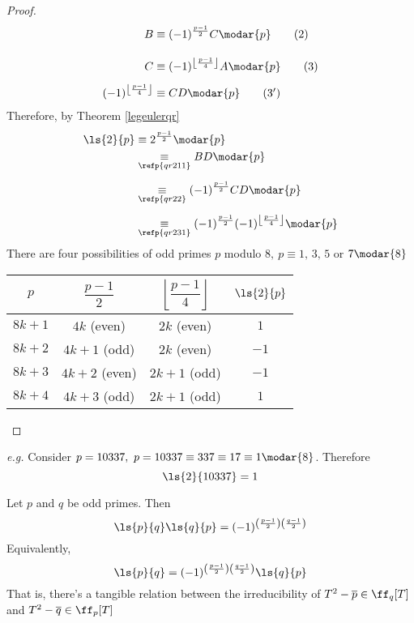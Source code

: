 \begin{proof}
\begin{align*}
B&\equiv (-1)^{\frac{p-1}{2}} C\modar{p} \label{qr22}\tag{$2$}\\[1em]
C &\equiv (-1)^{\left\lfloor \frac{p-1}{4}\right\rfloor} A\modar{p} \label{qr23}\tag{$3$}\\[0.5em]
(-1)^{\left\lfloor \frac{p-1}{4}\right\rfloor} &\equiv CD \modar{p} \label{qr231}\tag{$3'$}
\end{align*}
Therefore, by Theorem \ref{legeulerqr}
\begin{align*}
\ls{2}{p} &\equiv 2^{\frac{p-1}{2}}\modar{p}\\
&\underset{\refp{qr211}}{\equiv} BD\modar{p}\\[0.5em]
&\underset{\refp{qr22}}{\equiv} (-1)^{\frac{p-1}{2}} CD\modar{p}\\[0.5em]
&\underset{\refp{qr231}}{\equiv} (-1)^{\frac{p-1}{2}}(-1)^{\left\lfloor \frac{p-1}{4}\right\rfloor}\modar{p}
\end{align*}
There are four possibilities of odd primes $p$ modulo $8,\ p\equiv 1,\,3,\,5$ or $7\modar{8}$\\
\begin{center}
{\renewcommand{\arraystretch}{2}%
\begin{tabular}{|c|c|c|c|}
\hline
$p$ & $\dfrac{p-1}{2}$ & $\left\lfloor \dfrac{p-1}{4}\right\rfloor$ & $\ls{2}{p}$\\[0.5em]
\hline
$8k + 1$ & $4k$ (even) & $2k$ (even) & $1$ \\
\hline
$8k + 2$ & $4k + 1$ (odd) & $2k$ (even) & $-1$ \\
\hline
$8k + 3$ & $4k + 2$ (even) & $2k + 1$ (odd) & $-1$ \\
\hline
$8k + 4$ & $4k + 3$ (odd) & $2k + 1$ (odd) & $1$ \\
\hline
\end{tabular}}
\end{center}
\end{proof}

\vspace*{0.5em}

\emph{e.g.} Consider $p = 10337,\ p = 10337 \equiv 337 \equiv 17 \equiv 1 \modar{8}$. Therefore
\[\ls{2}{10337} = 1\]

\vspace*{1em}

\begin{theorem}
Let $p$ and $q$ be odd primes. Then
\[\ls{p}{q}\ls{q}{p} = (-1)^{\left(\frac{p-1}{2}\right)\left(\frac{q-1}{2}\right)}\]
Equivalently,
\[\ls{p}{q} = (-1)^{\left(\frac{p-1}{2}\right)\left(\frac{q-1}{2}\right)}\ls{q}{p}\]
That is, there's a tangible relation between the irreducibility of $T^2 - \overline{p} \in \ff_q[T]$ and $T^2 - \overline{q} \in \ff_p[T]$
\end{theorem}

